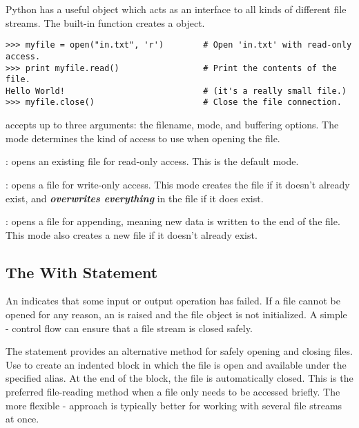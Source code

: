 Python has a useful  object which acts as an interface to all kinds of different file streams.
The built-in function  creates a  object.

\begin{lstlisting}
>>> myfile = open("in.txt", 'r')        # Open 'in.txt' with read-only access.
>>> print myfile.read()                 # Print the contents of the file.
Hello World!                            # (it's a really small file.)
>>> myfile.close()                      # Close the file connection.
\end{lstlisting}

 accepts up to three arguments: the filename, mode, and buffering options.
The mode determines the kind of access to use when opening the file.
\begin{description}
\item {}: opens an existing file for read-only access.
This is the default mode.
\item {}: opens a file for write-only access.
This mode creates the file if it doesn't already exist, and \textbf{\emph{overwrites everything}} in the file if it does exist.
\item {}: opens a file for appending, meaning new data is written to the end of the file.
This mode also creates a new file if it doesn't already exist.
\end{description}

\subsection*{The With Statement} %

An  indicates that some input or output operation has failed.
If a file cannot be opened for any reason, an  is raised and the file object is not initialized.
A simple - control flow can ensure that a file stream is closed safely.

The  statement provides an alternative method for safely opening and closing files.
Use  to create an indented block in which the file is open and available under the specified alias.
At the end of the block, the file is automatically closed.
This is the preferred file-reading method when a file only needs to be accessed briefly.
The more flexible - approach is typically better for working with several file streams at once.

